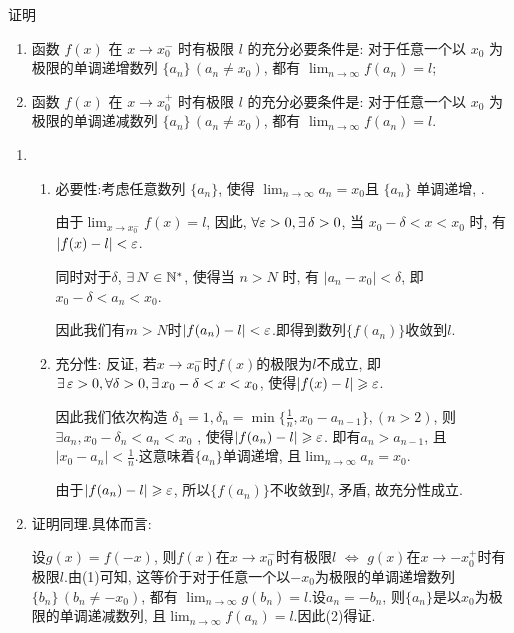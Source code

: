 \begin{exercise}[1.C.15]
    证明
    \begin{enumerate}[(1)]
        \item 函数 $f(x)$ 在 $x \to x_0^-$ 时有极限 $l$ 的充分必要条件是: 对于任意一个以 $x_0$ 为极限的单调递增数列 $\{a_n\} \,  (a_n \ne x_0)$,  都有 $\lim_{n \to \infty} f(a_n) = l$;
        \item 函数 $f(x)$ 在 $x \to x_0^+$ 时有极限 $l$ 的充分必要条件是: 对于任意一个以 $x_0$ 为极限的单调递减数列 $\{a_n\} \,  (a_n \ne x_0)$,  都有 $\lim_{n \to \infty} f(a_n) = l$.
    \end{enumerate}
\end{exercise}

\begin{solution}
    \begin{enumerate}[(1)]
        \item \begin{enumerate}
                  \item 必要性:考虑任意数列 $\{a_n\}$,  使得 $\lim_{n\to\infty}a_n = x_0$且 $\{a_n\}$ 单调递增, .

                        由于$\lim_{x \to x_0^-}f(x)=l$, 因此, $\forall \ve > 0,  \exists \delta > 0$,  当 $x_0 - \delta < x < x_0$ 时,  有 $|f(x) - l| < \varepsilon$.

                        同时对于$\delta$, $\exists N \in \N^*$, 使得当 $n > N$ 时,  有 $|a_n - x_0| < \delta$, 即 $x_0 - \delta < a_n < x_0$.

                        因此我们有$m>N$时$|f(a_n)-l|<\varepsilon$.即得到数列$\{f(a_n)\}$收敛到$l$.
                  \item 充分性: 反证, 若$x\to x_0^-$时$f(x)$的极限为$l$不成立, 即$\exists \ve > 0,  \forall \delta > 0,  \exists x_0 - \delta < x < x_0$,  使得$|f(x) - l| \geqslant \varepsilon$.

                        因此我们依次构造 $\delta_1=1, \delta_n = \min\{\frac{1}{n}, x_0-a_{n-1}\}, (n>2)$, 则$\exists a_n, x_0-\delta_n<a_n<x_0$ , 使得$|f(a_n) - l| \geqslant \varepsilon$.
                        即有$a_n>a_{n-1}$, 且$|x_0-a_n|<\frac{1}{n}$.这意味着$\{a_n\}$单调递增, 且$\lim_{n \to \infty} a_n = x_0$.

                        由于$|f(a_n) - l| \geqslant \varepsilon$, 所以$\{f(a_n)\}$不收敛到$l$, 矛盾, 故充分性成立.
              \end{enumerate}
        \item 证明同理.具体而言:

              设$g(x) = f(-x)$, 则$f(x)$在$x\to x_0^-$时有极限$l$ $\Leftrightarrow$ $g(x)$在$x\to -x_0^+$时有极限$l$.由(1)可知, 这等价于对于任意一个以$-x_0$为极限的单调递增数列$\{b_n\} \,  (b_n \ne -x_0)$,  都有 $\lim_{n \to \infty} g(b_n) = l$.设$a_n=-b_n$, 则$\{a_n\}$是以$x_0$为极限的单调递减数列, 且$\lim_{n \to \infty} f(a_n) = l$.因此(2)得证.
    \end{enumerate}
\end{solution}

